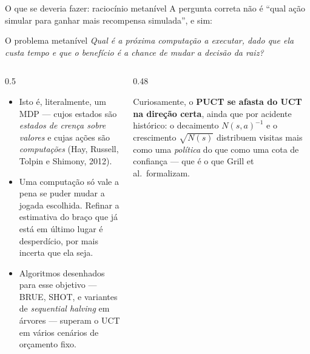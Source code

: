 \documentclass[aspectratio=169, 10pt]{beamer}
\newcommand{\Nvis}{N}
\begin{document}
\begin{frame}{O que se deveria fazer: raciocínio metanível}
  \footnotesize
  A pergunta correta não é ``qual ação simular para ganhar mais recompensa
  simulada'', e sim:

  \begin{center}
    \begin{minipage}{0.84\textwidth}
      \begin{teobox}{O problema metanível}
        \emph{Qual é a próxima computação a executar, dado que ela custa tempo e
        que o benefício é a chance de mudar a decisão da raiz?}
      \end{teobox}
    \end{minipage}
  \end{center}

  \begin{columns}[T]
    \begin{column}{0.5\textwidth}
      \begin{itemize}
        \item Isto é, literalmente, um MDP --- cujos estados são \emph{estados de
              crença sobre valores} e cujas ações são \emph{computações}
              (Hay, Russell, Tolpin e Shimony, 2012).
        \item Uma computação só vale a pena se puder \alert{mudar} a jogada
              escolhida. Refinar a estimativa do braço que já está em último lugar
              é desperdício, por mais incerta que ela seja.
        \item Algoritmos desenhados para esse objetivo --- BRUE, SHOT, e variantes
              de \emph{sequential halving} em árvores --- superam o UCT em vários
              cenários de orçamento fixo.
      \end{itemize}
    \end{column}
    \begin{column}{0.48\textwidth}
      \begin{ideiabox}
        Curiosamente, o \textbf{PUCT se afasta do UCT na direção certa}, ainda que
        por acidente histórico: o decaimento $\Nvis(s,a)^{-1}$ e o crescimento
        $\sqrt{\Nvis(s)}$ distribuem visitas mais como uma \emph{política} do que
        como uma cota de confiança --- que é o que Grill et al.\ formalizam.
      \end{ideiabox}
    \end{column}
  \end{columns}
\end{frame}
\end{document}
